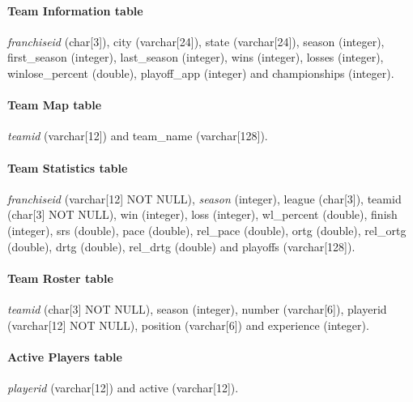 \paragraph{Team Information table}\textit{franchiseid} (char[3]), city (varchar[24]), state (varchar[24]), season (integer), first\_season (integer), last\_season (integer), wins (integer), losses (integer), winlose\_percent (double), playoff\_app (integer) and championships (integer).

\paragraph{Team Map table}\textit{teamid} (varchar[12]) and team\_name (varchar[128]).

\paragraph{Team Statistics table}\textit{franchiseid} (varchar[12] NOT NULL), \textit{season} (integer), league (char[3]), teamid (char[3] NOT NULL), win (integer), loss (integer), wl_percent (double), finish (integer), srs (double), pace (double), rel_pace (double), ortg (double), rel_ortg (double), drtg (double), rel_drtg (double) and playoffs (varchar[128]).

\paragraph{Team Roster table}\textit{teamid} (char[3] NOT NULL), season (integer), number (varchar[6]), playerid (varchar[12] NOT NULL), position (varchar[6]) and experience (integer).

\paragraph{Active Players table}\textit{playerid} (varchar[12]) and active (varchar[12]).

